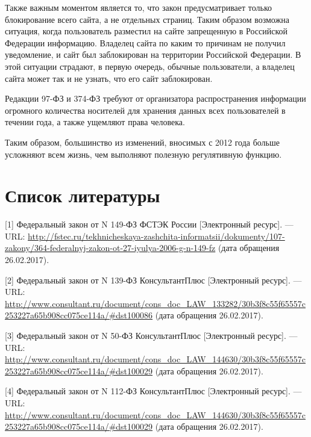 \documentclass[14pt,a4paper,report]{article}
\begin{document}
Также важным моментом является то, что закон предусматривает только блокирование всего сайта, а не отдельных страниц. Таким образом возможна ситуация, когда пользователь разместил на сайте запрещенную в Российской Федерации информацию. Владелец сайта по каким то причинам не получил уведомление, и сайт был заблокирован на территории Российской Федерации. В этой ситуации страдают, в первую очередь, обычные пользователи, а владелец сайта может так и не узнать, что его сайт заблокирован.

Редакции 97-ФЗ и 374-ФЗ требуют от организатора распространения информации огромного количества носителей для хранения данных всех пользователей в течении года, а также ущемляют права человека.

Таким образом, большинство из изменений, вносимых с 2012 года больше усложняют всем жизнь, чем выполняют полезную регулятивную функцию.

\section{Список литературы}

[1] Федеральный закон от N 149-ФЗ ФСТЭК России [Электронный ресурс]. — URL: \href{http://fstec.ru/tekhnicheskaya-zashchita-informatsii/dokumenty/107-zakony/364-federalnyj-zakon-ot-27-iyulya-2006-g-n-149-fz}{http://fstec.ru/\linebreak tekhnicheskaya-zashchita-informatsii/dokumenty/107-zakony/364-federalnyj-zakon-ot-27-iyulya-2006-g-n-149-fz} (дата обращения 26.02.2017).

[2] Федеральный закон от N 139-ФЗ КонсультантПлюс [Электронный ресурс]. — URL: \href{http://www.consultant.ru/document/cons_doc_LAW_133282/30b3f8c55f65557c253227a65b908cc075ce114a/#dst100086}{http://www.consultant.\linebreak ru/document/cons\_doc\_LAW\_133282/30b3f8c55f65557c253227a65b908cc075ce114a/\#dst100086} (дата обращения 26.02.2017).

[3] Федеральный закон от N 50-ФЗ КонсультантПлюс [Электронный ресурс]. — URL: \href{http://www.consultant.ru/document/cons_doc_LAW_144630/30b3f8c55f65557c253227a65b908cc075ce114a/#dst100029}{http://www.consultant.\linebreak ru/document/cons\_doc\_LAW\_144630/30b3f8c55f65557c253227a65b908cc075ce114a/\#dst100029} (дата обращения 26.02.2017).

[4] Федеральный закон от N 112-ФЗ КонсультантПлюс [Электронный ресурс]. — URL: \href{http://www.consultant.ru/document/cons_doc_LAW_144630/30b3f8c55f65557c253227a65b908cc075ce114a/#dst100029}{http://www.consultant.\linebreak ru/document/cons\_doc\_LAW\_144630/30b3f8c55f65557c253227a65b908cc075ce114a/\#dst100029} (дата обращения 26.02.2017).
\end{document}
